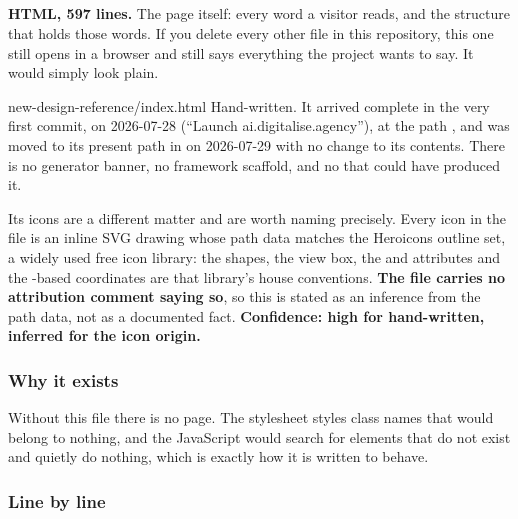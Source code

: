 \subsection{}

\textbf{HTML, 597 lines.} The page itself: every word a visitor reads, and the
structure that holds those words. If you delete every other file in this
repository, this one still opens in a browser and still says everything the
project wants to say. It would simply look plain.

\begin{provenance}{new-design-reference/index.html}
Hand-written. It arrived complete in the very first commit,  on
2026-07-28 (``Launch ai.digitalise.agency''), at the path , and
was moved to its present path in  on 2026-07-29 with no change to
its contents. There is no generator banner, no framework scaffold, and no
 that could have produced it.

Its icons are a different matter and are worth naming precisely. Every icon in
the file is an inline SVG drawing whose path data matches the Heroicons outline
set, a widely used free icon library: the shapes, the  view box, the
 and  attributes and the
-based coordinates are that library's house conventions. \textbf{The
file carries no attribution comment saying so}, so this is stated as an inference
from the path data, not as a documented fact. \textbf{Confidence: high for
hand-written, inferred for the icon origin.}
\end{provenance}

\subsubsection*{Why it exists}

Without this file there is no page. The stylesheet styles class names that would
belong to nothing, and the JavaScript would search for elements that do not
exist and quietly do nothing, which is exactly how it is written to behave.

\subsubsection*{Line by line}

